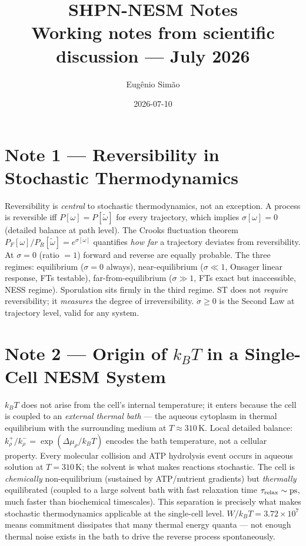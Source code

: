 \documentclass[11pt,a4paper]{article}
\title{\textbf{SHPN-NESM Notes}\\
  \large Working notes from scientific discussion --- July 2026}
\author{Eug\^{e}nio Sim\~{a}o}
\date{2026-07-10}
\begin{document}
\maketitle
\tableofcontents
\newpage

\section*{Note 1 — Reversibility in Stochastic Thermodynamics}

Reversibility is \emph{central} to stochastic thermodynamics, not an
exception. A process is reversible iff $P[\omega] = P[\tilde\omega]$ for
every trajectory, which implies $\sigma[\omega] = 0$ (detailed balance at
path level). The Crooks fluctuation theorem $P_F[\omega]/P_R[\tilde\omega]
= e^{\sigma[\omega]}$ quantifies \emph{how far} a trajectory deviates from
reversibility. At $\sigma = 0$ (ratio $= 1$) forward and reverse are
equally probable. The three regimes: equilibrium ($\sigma = 0$ always),
near-equilibrium ($\sigma \ll 1$, Onsager linear response, FTs testable),
far-from-equilibrium ($\sigma \gg 1$, FTs exact but inaccessible, NESS
regime). Sporulation sits firmly in the third regime. ST does not
\emph{require} reversibility; it \emph{measures} the degree of
irreversibility. $\dot\sigma \geq 0$ is the Second Law at trajectory
level, valid for any system.

\section*{Note 2 — Origin of $k_BT$ in a Single-Cell NESM System}

$k_BT$ does not arise from the cell's internal temperature; it enters
because the cell is coupled to an \emph{external thermal bath} — the
aqueous cytoplasm in thermal equilibrium with the surrounding medium at
$T \approx 310\,\text{K}$. Local detailed balance:
$k^+_\rho / k^-_\rho = \exp(\Delta\mu_\rho / k_BT)$ encodes the bath
temperature, not a cellular property. Every molecular collision and ATP
hydrolysis event occurs in aqueous solution at $T = 310\,\text{K}$;
the solvent is what makes reactions stochastic. The cell is
\emph{chemically} non-equilibrium (sustained by ATP/nutrient gradients)
but \emph{thermally} equilibrated (coupled to a large solvent bath with
fast relaxation time $\tau_{\rm relax} \sim \text{ps}$, much faster than
biochemical timescales). This separation is precisely what makes
stochastic thermodynamics applicable at the single-cell level. $W/k_BT
= 3.72\times10^7$ means commitment dissipates that many thermal energy
quanta — not enough thermal noise exists in the bath to drive the reverse
process spontaneously.
\end{document}
